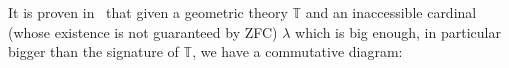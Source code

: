 \documentclass{article}
\newcommand{\T}{\mathbb{T}}
\newcommand{\Lex}{\operatorname{Lex}}
\newcommand{\Sh}{\mathbf{Sh}}
\newcommand{\yo}{\text{\usefont{U}{min}{m}{n}\symbol{'110}}}
\renewcommand{\phi}{\varphi}
\newcommand{\Set}{\mathbf{Set}}
\newcommand{\Mod}{{\mathbf{Mod}}}
\begin{document}
 It is proven in~\cite[Theorem 5.5]{espindola2023every} that given a geometric theory $\T$ and an inaccessible cardinal (whose existence is not guaranteed by ZFC) $\lambda$ which is big enough, in particular bigger than the signature of $\T$, we have a commutative diagram:

 \begin{center}
 \end{center}
\end{document}
